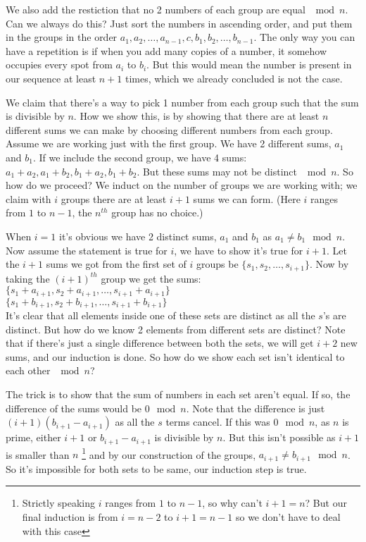 \documentclass[a4paper,10pt]{article}
\theoremstyle{definition} %
\begin{document}
    We also add the restiction that no 2 numbers of each group are equal $\mod n$. Can
    we always do this? Just sort the numbers in ascending order, and put them in the 
    groups in the order $a_1, a_2, \dots, a_{n-1}, c, b_1, b_2, \dots, b_{n-1}$. The only
    way you can have a repetition is if when you add many copies of a number, it somehow
    occupies every spot from $a_i$ to $b_i$. But this would mean the number is present in
    our sequence at least $n+1$ times, which we already concluded is not the case.

    We claim that there's a way to pick 1 number from each group such that the sum is 
    divisible by $n$. How we show this, is by showing that there are at least $n$ 
    different sums we can make by choosing different numbers from each group. Assume we 
    are working just with the first group. We have 2 different sums, $a_1$ and $b_1$.
    If we include the second group, we have 4 sums: $a_1+a_2, a_1+ b_2, b_1+a_2, b_1+b_2$.
    But these sums may not be distinct $\mod n$. So how do we proceed? We induct on the 
    number of groups we are working with; we claim with $i$ groups there are at least $i+1$
    sums we can form. (Here $i$ ranges from $1$ to $n-1$, the $n^{th}$ group has no choice.)

    When $i=1$ it's obvious we have 2 distinct sums, $a_1$ and $b_1$ as $a_1 \neq b_1 \mod n$.
    Now assume the statement is true for $i$, we have to show it's true for $i+1$.
    Let the $i+1$ sums we got from the first set of $i$ groups be $\{s_1, s_2, \dots, s_{i+1}\}$.
    Now by taking the $(i+1)^{th}$ group we get the sums: \\
    $\{s_1+a_{i+1}, s_2+a_{i+1}, \dots, s_{i+1} + a_{i+1}\}$ \\
    $\{s_1+b_{i+1}, s_2+b_{i+1}, \dots, s_{i+1} + b_{i+1}\}$ \\
    It's clear that all elements inside one of these sets are distinct as all the $s$'s are distinct.
    But how do we know 2 elements from different sets are distinct? Note that if there's
    just a single difference between both the sets, we will get $i+2$ new sums, and our induction
    is done. So how do we show each set isn't identical to each other $\mod n$?

    The trick is to show that the sum of numbers in each set aren't equal. If so, the
    difference of the sums would be $0 \mod n$. Note that the difference is just
    $(i+1)(b_{i+1}-a_{i+1})$ as all the $s$ terms cancel. If this was $0 \mod n$, 
    as $n$ is prime, either $i+1$ or $b_{i+1}-a_{i+1}$ is divisible by $n$. But this isn't
    possible as $i+1$ is smaller than $n$
    \footnote{Strictly speaking $i$ ranges from $1$ to $n-1$, so why can't $i+1 = n$?
    But our final induction is from $i = n-2$ to $i+1 = n-1$ so we don't have to deal 
    with this case}
    and by our construction of the groups, $a_{i+1} \neq b_{i+1} \mod n$. So it's 
    impossible for both sets to be same, our induction step is true. 
\end{document}
